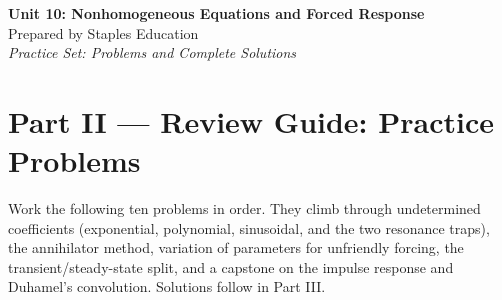 




\begin{center}
    {\LARGE \bfseries Unit 10: Nonhomogeneous Equations and Forced Response}\\[6pt]
    {\large Prepared by Staples Education}\\[4pt]
    {\itshape Practice Set: Problems and Complete Solutions}
\end{center}

\vspace{0.4em}

{}
\section*{Part II --- Review Guide: Practice Problems}

Work the following ten problems in order. They climb through undetermined
coefficients (exponential, polynomial, sinusoidal, and the two resonance traps),
the annihilator method, variation of parameters for unfriendly forcing, the
transient/steady-state split, and a capstone on the impulse response and
Duhamel's convolution. Solutions follow in Part III.

